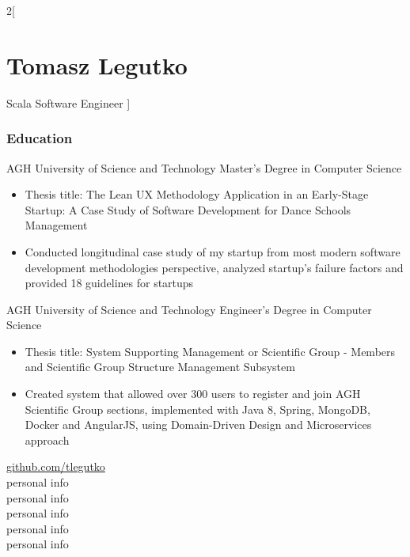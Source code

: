 \documentclass{tccv}
\begin{document}
\begin{multicols}{2}[
\part{Tomasz Legutko}{Scala Software Engineer}
]
\begin{eventlist}
\end{eventlist}

\bigskip
\section{Education}
\begin{eventlist}

     {AGH University of Science and Technology}
     {Master's Degree in Computer Science}
     \begin{itemize}[noitemsep,topsep=0pt]
     \item Thesis title: The Lean UX Methodology Application in an Early-Stage Startup: A Case Study of Software Development for Dance Schools Management
     \item Conducted longitudinal case study of my startup from most modern software development methodologies perspective, analyzed startup's failure factors and provided 18 guidelines for startups
     \end{itemize}

     {AGH University of Science and Technology}
     {Engineer's Degree in Computer Science}
     \begin{itemize}[noitemsep,topsep=0pt]
     \item Thesis title: System Supporting Management or Scientific Group - Members and Scientific Group Structure Management Subsystem
     \item Created system that allowed over 300 users to register and join AGH Scientific Group sections, implemented with Java 8, Spring, MongoDB, Docker and AngularJS, using Domain-Driven Design and Microservices approach
     \end{itemize}

\end{eventlist}

\vfill\null
\columnbreak

\hspace*{0.7pt}\faGithub\hspace{1pt} \href{https://github.com/tlegutko}{github.com/tlegutko}\\
\faEnvelope\hspace{0.5pt} personal info\\
\hspace*{1.4pt}\faPhone\hspace{1.2pt} personal info\\ 
\hspace*{2.5pt}\faMapMarker\hspace{2pt} personal info\\
\hspace*{2.6pt}\phantom\faMapMarker \hspace{2pt} personal info\\
\faBirthdayCake\hspace{0.7pt} personal info\\


\end{multicols}
\end{document}
